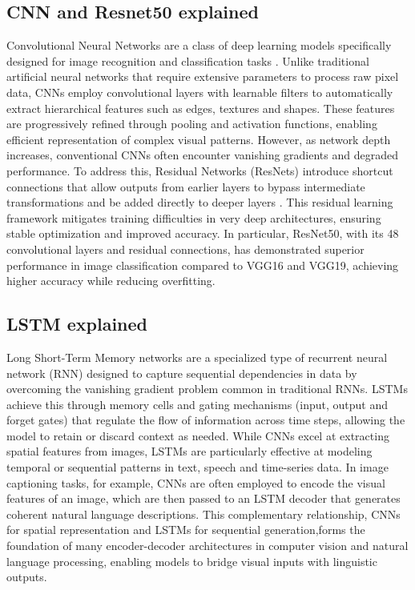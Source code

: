 \documentclass{article}
\begin{document}
\subsection{CNN and Resnet50 explained}
Convolutional Neural Networks are a class of deep learning models specifically designed for image recognition and classification tasks \cite{naranjo2020review}. Unlike traditional artificial neural networks that require extensive parameters to process raw pixel data, CNNs employ convolutional layers with learnable filters to automatically extract hierarchical features such as edges, textures and shapes. These features are progressively refined through pooling and activation functions, enabling efficient representation of complex visual patterns. However, as network depth increases, conventional CNNs often encounter vanishing gradients and degraded performance. To address this, Residual Networks (ResNets) introduce shortcut connections that allow outputs from earlier layers to bypass intermediate transformations and be added directly to deeper layers \cite{mascarenhas2021comparison}. This residual learning framework mitigates training difficulties in very deep architectures, ensuring stable optimization and improved accuracy. In particular, ResNet50, with its 48 convolutional layers and residual connections, has demonstrated superior performance in image classification compared to VGG16 and VGG19, achieving higher accuracy while reducing overfitting.

\subsection{LSTM explained}
Long Short-Term Memory networks are a specialized type of recurrent neural network (RNN) designed to capture sequential dependencies in data by overcoming the vanishing gradient problem common in traditional RNNs. LSTMs achieve this through memory cells and gating mechanisms (input, output and forget gates) that regulate the flow of information across time steps, allowing the model to retain or discard context as needed\cite{hochreiter1997long}. While CNNs excel at extracting spatial features from images, LSTMs are particularly effective at modeling temporal or sequential patterns in text, speech and time-series data. In image captioning tasks, for example, CNNs are often employed to encode the visual features of an image, which are then passed to an LSTM decoder that generates coherent natural language descriptions. This complementary relationship, CNNs for spatial representation and LSTMs for sequential generation,forms the foundation of many encoder-decoder architectures in computer vision and natural language processing, enabling models to bridge visual inputs with linguistic outputs.
\end{document}
